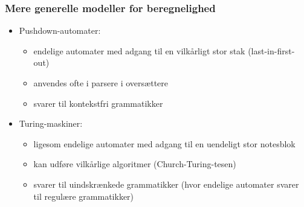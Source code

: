 \documentclass[]{beamer}
\begin{document}
\begin{frame}
\frametitle{Mere generelle modeller for beregnelighed}
\begin{itemize}
\item Pushdown-automater:
\begin{itemize}
\item endelige automater med adgang til en vilkårligt stor stak (last-in-first-out)
\item anvendes ofte i parsere i oversættere
\item svarer til kontekstfri grammatikker
\end{itemize}
\item Turing-maskiner:
\begin{itemize}
\item ligesom endelige automater med adgang til en uendeligt stor notesblok
\item kan udføre vilkårlige algoritmer (Church-Turing-tesen)
\item svarer til uindskrænkede grammatikker (hvor endelige automater svarer til regulære grammatikker)
\end{itemize}

\end{itemize}
\end{frame}
\end{document}
